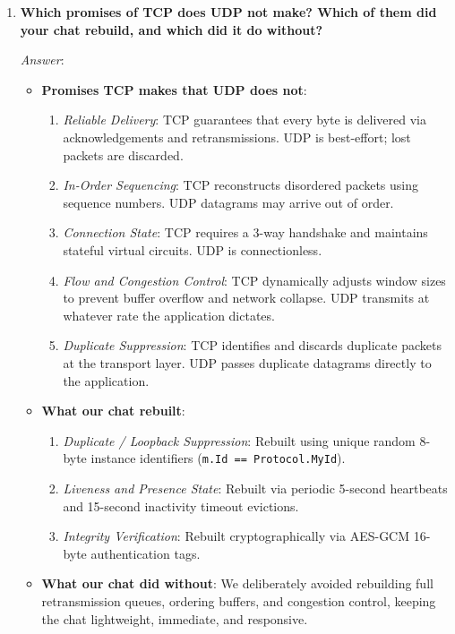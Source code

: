 \documentclass[11pt,a4paper]{article}
\begin{document}
\begin{enumerate}[label=\textbf{Control Question \arabic*:}, leftmargin=*]
    \item \textbf{Which promises of TCP does UDP not make? Which of them did your chat rebuild, and which did it do without?}
    
    \textit{Answer}: 
    \begin{itemize}
        \item \textbf{Promises TCP makes that UDP does not}:
        \begin{enumerate}[label=(\alph*), noitemsep]
            \item \textit{Reliable Delivery}: TCP guarantees that every byte is delivered via acknowledgements and retransmissions. UDP is best-effort; lost packets are discarded.
            \item \textit{In-Order Sequencing}: TCP reconstructs disordered packets using sequence numbers. UDP datagrams may arrive out of order.
            \item \textit{Connection State}: TCP requires a 3-way handshake and maintains stateful virtual circuits. UDP is connectionless.
            \item \textit{Flow and Congestion Control}: TCP dynamically adjusts window sizes to prevent buffer overflow and network collapse. UDP transmits at whatever rate the application dictates.
            \item \textit{Duplicate Suppression}: TCP identifies and discards duplicate packets at the transport layer. UDP passes duplicate datagrams directly to the application.
        \end{enumerate}
        \item \textbf{What our chat rebuilt}:
        \begin{enumerate}[label=(\alph*), noitemsep]
            \item \textit{Duplicate / Loopback Suppression}: Rebuilt using unique random 8-byte instance identifiers (\texttt{m.Id == Protocol.MyId}).
            \item \textit{Liveness and Presence State}: Rebuilt via periodic 5-second heartbeats and 15-second inactivity timeout evictions.
            \item \textit{Integrity Verification}: Rebuilt cryptographically via AES-GCM 16-byte authentication tags.
        \end{enumerate}
        \item \textbf{What our chat did without}: We deliberately avoided rebuilding full retransmission queues, ordering buffers, and congestion control, keeping the chat lightweight, immediate, and responsive.
    \end{itemize}


\end{enumerate}
\end{document}
